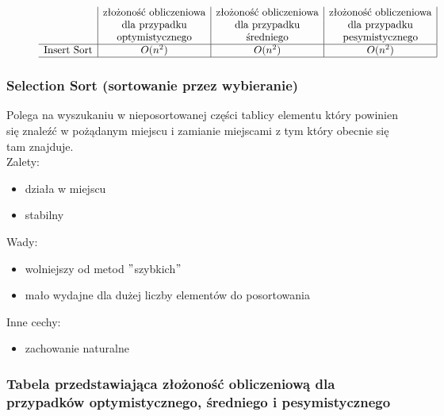 \documentclass[polish,polish,a4paper]{article}
\begin{document}
\begin{spacing}{1.5}
	\begin{figure}[H]
		\begin{equation*}
		\begin{array}{l|c|c|c|}

		&$złożoność obliczeniowa$&$złożoność obliczeniowa$&$złożoność obliczeniowa$\\
		&$dla przypadku$&$dla przypadku$&$dla przypadku$\\
		&$optymistycznego$&$średniego$&$pesymistycznego$\\
		\hline
		$Insert Sort$&O(n^2)&O(n^2)&O(n^2)\\
		\hline
		\end{array}
		\end{equation*}
	\end{figure}
		
		\subsubsection*{Selection Sort (sortowanie przez wybieranie)}
		Polega na wyszukaniu w nieposortowanej części tablicy elementu który powinien się znaleźć w pożądanym miejscu i zamianie miejscami z tym który obecnie się tam znajduje.\\
		
	Zalety:
	\begin{itemize}
		\item działa w miejscu
		\item stabilny 
	\end{itemize}
	Wady:
	\begin{itemize}
		\item wolniejszy od metod $ " $szybkich$ " $
		\item mało wydajne dla dużej liczby elementów do posortowania
	\end{itemize}
	Inne cechy:
	\begin{itemize}
		\item zachowanie naturalne
	\end{itemize}
	
				\subsubsection*{Tabela przedstawiająca złożoność obliczeniową dla przypadków optymistycznego, średniego i pesymistycznego} 
	\begin{figure}[H]

		\begin{equation*}
		\begin{array}{l|c|c|c|}


\end{array}
\end{equation*}
\end{figure}
\end{spacing}
\end{document}
